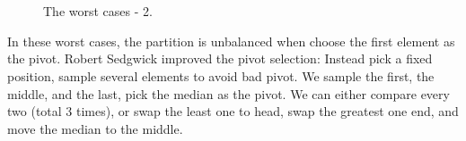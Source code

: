 \documentclass[b5paper]{article}
\begin{document}
\begin{figure}[htbp]
   \centering
    \\
    \\
   \caption{The worst cases - 2.}
   \label{fig:worst-cases-2}
\end{figure}

In these worst cases, the partition is unbalanced when choose the first element as the pivot. Robert Sedgwick improved the pivot selection\cite{qsort-impl}: Instead pick a fixed position, sample several elements to avoid bad pivot. We sample the first, the middle, and the last, pick the median as the pivot. We can either compare every two (total 3 times)\cite{3-way-part}, or swap the least one to head, swap the greatest one end, and move the median to the middle.
\end{document}
